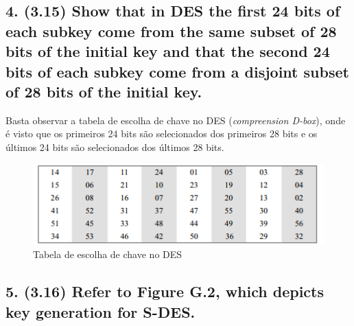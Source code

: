 \documentclass[12pt]{article}
\begin{document}

\subsection*{4. (3.15) Show that in DES the first 24 bits of each subkey come
from the same subset of 28 bits of the initial key and that the second 24 bits
of each subkey come from a disjoint subset of 28 bits of the initial key.}

  Basta observar a tabela de escolha de chave no DES (\textit{compreension D-box}), onde é visto que os primeiros 24 bits são selecionados dos primeiros 28 bits e os últimos 24 bits são selecionados dos últimos 28 bits.

  \begin{figure}[h]
    \includegraphics[width=\linewidth]{des_key_table}
    \caption{Tabela de escolha de chave no DES}
  \end{figure}

\subsection*{5. (3.16) Refer to Figure G.2, which depicts key generation for
S-DES.}
\end{document}
